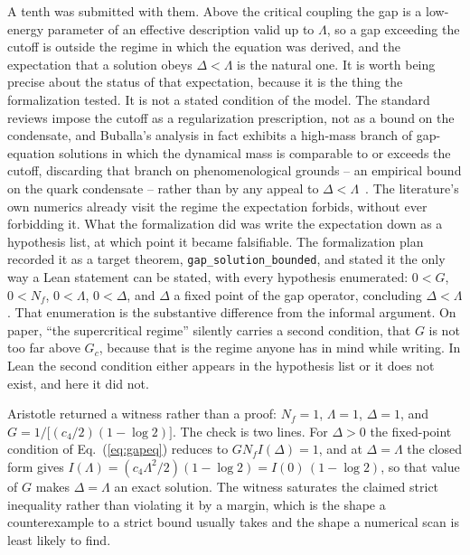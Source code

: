 \documentclass[11pt]{article}
\begin{document}
A tenth was submitted with them. Above the critical coupling the gap is
a low-energy parameter of an effective description valid up to
$\Lambda$, so a gap exceeding the cutoff is outside the regime in which
the equation was derived, and the expectation that a solution obeys
$\Delta < \Lambda$ is the natural one. It is worth being precise about
the status of that expectation, because it is the thing the formalization
tested. It is not a stated condition of the model. The standard reviews
impose the cutoff as a regularization prescription, not as a bound on the
condensate, and Buballa's analysis in fact exhibits a high-mass branch of
gap-equation solutions in which the dynamical mass is comparable to or
exceeds the cutoff, discarding that branch on phenomenological grounds --
an empirical bound on the quark condensate -- rather than by any
appeal to $\Delta < \Lambda$~\cite{Buballa2005}. The literature's own
numerics already visit the regime the expectation forbids, without ever
forbidding it. What the formalization did was write the expectation down
as a hypothesis list, at which point it became falsifiable. The formalization plan recorded
it as a target theorem, \texttt{gap\_solution\_bounded}, and stated it
the only way a Lean statement can be stated, with every hypothesis
enumerated: $0 < G$, $0 < N_f$, $0 < \Lambda$, $0 < \Delta$, and
$\Delta$ a fixed point of the gap operator, concluding $\Delta <
\Lambda$. That enumeration is the substantive difference from the
informal argument. On paper, ``the supercritical regime'' silently
carries a second condition, that $G$ is not too far above $G_c$,
because that is the regime anyone has in mind while writing. In Lean
the second condition either appears in the hypothesis list or it does
not exist, and here it did not.

Aristotle returned a witness rather than a proof: $N_f = 1$,
$\Lambda = 1$, $\Delta = 1$, and
$G = 1/\bigl[(c_4/2)(1-\log 2)\bigr]$. The check is two lines. For
$\Delta > 0$ the fixed-point condition of Eq.~(\ref{eq:gapeq}) reduces
to $G N_f I(\Delta) = 1$, and at $\Delta = \Lambda$ the closed form
gives $I(\Lambda) = (c_4\Lambda^2/2)(1-\log 2) = I(0)\,(1-\log 2)$, so
that value of $G$ makes $\Delta = \Lambda$ an exact solution. The
witness saturates the claimed strict inequality rather than violating
it by a margin, which is the shape a counterexample to a strict bound
usually takes and the shape a numerical scan is least likely to find.
\end{document}
